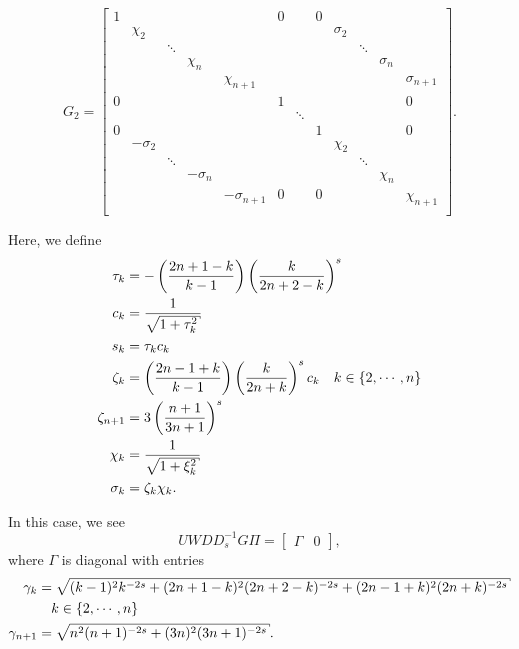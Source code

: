 \begin{equation}
    G_{2} = \begin{bmatrix}
        1 & & & & & 0 & & 0 & \\
        & \chi_{2} & & & & & & & \sigma_{2} & \\
        & & \ddots & & & & & & & \ddots & \\
        & & & \chi_{n} & & & & & & & \sigma_{n} & \\
        & & & & \chi_{n+1} & & & & & & & \sigma_{n+1}\\
        0 & & & & & 1 & & & & & & 0 \\
        & & & & & & \ddots & \\
        0 & & & & & & & 1 & & & & 0 \\
        & -\sigma_{2} & & & & & & & \chi_{2} & \\
        & & \ddots & & & & & & & \ddots & \\
        & & & -\sigma_{n} & & & & & & & \chi_{n} & \\
        & & & & -\sigma_{n+1} & 0 & & 0 & & & & \chi_{n+1} \\
    \end{bmatrix}.
\end{equation}

\noindent
Here, we define
%
\begin{align}
    \tau_{k} &= -\parens{\frac{2n+1-k}{k-1}}
                \parens{\frac{k}{2n+2-k}}^{s} \nonumber\\
    c_{k} &= \frac{1}{\sqrt{1 + \tau_{k}^{2}}} \nonumber\\
    s_{k} &= \tau_{k}c_{k} \nonumber\\
    \zeta_{k} &= \parens{\frac{2n-1+k}{k-1}}
                \parens{\frac{k}{2n+k}}^{s}c_{k} \quad k\in\braces{2,\cdots,n}
                \nonumber\\
    \zeta_{n+1} &= 3\parens{\frac{n+1}{3n+1}}^{s} \nonumber\\
    \chi_{k} &= \frac{1}{\sqrt{1 + \xi_{k}^{2}}} \nonumber\\
    \sigma_{k} &= \zeta_{k}\chi_{k}.
\end{align}

In this case, we see
%
\begin{equation}
    UWDD_{s}^{-1}G\Pi = \begin{bmatrix} \Gamma & 0 \end{bmatrix},
\end{equation}
%
where $\Gamma$ is diagonal with entries
%
\begin{align}
    \gamma_{k} &= \sqrt{(k-1)^{2}k^{-2s} + (2n+1-k)^{2}(2n+2-k)^{-2s} +
                        (2n-1+k)^{2}(2n+k)^{-2s}} \nonumber\\
                &\quad
                        k\in\braces{2,\cdots,n} \nonumber\\
    \gamma_{n+1} &= \sqrt{n^{2}(n+1)^{-2s} + (3n)^{2}(3n+1)^{-2s}}.
\end{align}



